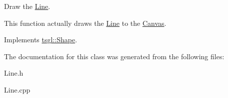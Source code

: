 \-Draw the \hyperlink{classtsgl_1_1_line}{\-Line}. 

\-This function actually draws the \hyperlink{classtsgl_1_1_line}{\-Line} to the \hyperlink{classtsgl_1_1_canvas}{\-Canvas}. 

\-Implements \hyperlink{classtsgl_1_1_shape_af78b1627b97d621824ce86db214e2402}{tsgl\-::\-Shape}.



\-The documentation for this class was generated from the following files\-:\begin{DoxyCompactItemize}
\item 
\-Line.\-h\item 
\-Line.\-cpp\end{DoxyCompactItemize}

